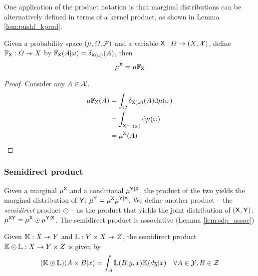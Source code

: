 One application of the product notation is that marginal distributions can be alternatively defined in terms of a kernel product, as shown in Lemma \ref{lem:pushf_kprod}.

\begin{lemma}\label{lem:pushf_kprod}
Given a probability space $(\mu,\Omega,\mathcal{F})$ and a variable $\mathsf{X}:\Omega\to (X,\mathcal{X})$, define $\mathbb{F}_{\mathsf{X}}:\Omega\rightarrowtriangle X$ by $\mathbb{F}_{\mathsf{X}}(A|\omega)=\delta_{\mathsf{X}(\omega)}(A)$, then
\begin{align}
	\mu^{\mathsf{X}} = \mu\mathbb{F}_{\mathsf{X}}
\end{align}
\end{lemma}

\begin{proof}
Consider any $A\in \mathcal{X}$.
\begin{align}
	\mu \mathbb{F}_{\mathsf{X}}(A) &= \int_\Omega \delta_{\mathsf{X}(\omega)}(A) \mathrm{d}\mu(\omega)\\
	&= \int_{\mathsf{X}^{-1}(\omega)} \mathrm{d}\mu(\omega)\\
	&= \mu^{\mathsf{X}}(A)
\end{align}
\end{proof}

\subsubsection{Semidirect product}

Given a marginal $\mu^{\mathsf{X}}$ and a conditional $\mu^{\mathsf{Y}|\mathsf{X}}$, the product of the two yields the marginal distribution of $\mathsf{Y}$: $\mu^{\mathsf{Y}}=\mu^{\mathsf{X}}\mu^{\mathsf{Y}|\mathsf{X}}$. We define another product -- the \emph{semidirect} product $\odot$ -- as the product that yields the joint distribution of $(\mathsf{X},\mathsf{Y})$: $\mu^{\mathsf{XY}}=\mu^{\mathsf{X}}\odot\mu^{\mathsf{Y}|\mathsf{X}}$. The semidirect product is associative (Lemma \ref{lem:sdp_assoc})

\begin{definition}\label{def:copyproduct}
Given $\mathbb{K}:X\rightarrowtriangle Y$ and $\mathbb{L}:Y\times X\rightarrowtriangle Z$, the semidirect product $\mathbb{K}\odot\mathbb{L}:X\to Y\times Z$ is given by
\begin{align}
    (\mathbb{K}\odot\mathbb{L})(A\times B|x) &= \int_A \mathbb{L}(B|y,x)\mathbb{K}(dy|x)&\forall A\in \mathcal{Y},B\in\mathcal{Z}
\end{align}
\end{definition}


